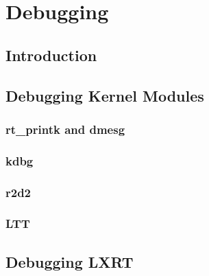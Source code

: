\chapter{Debugging}

\section{Introduction}

\section{Debugging Kernel Modules}
\subsection{rt\_printk and dmesg} %
\subsection{kdbg}
\subsection{r2d2}
\subsection{LTT}

\section{Debugging LXRT}

